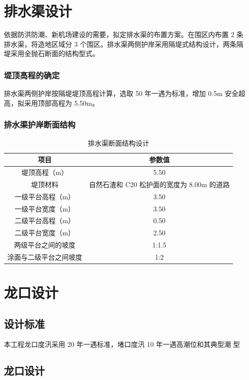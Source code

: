 \documentclass[UTF8, a4paper, 12pt]{ctexart} %
\begin{document}
\section{排水渠设计}
依据防洪防潮、新机场建设的需要，拟定排水渠的布置方案。在围区内布置 2 条排水渠，将造地区域分 3 个围区。排水渠两侧护岸采用隔堤式结构设计，两条隔堤采用全抛石断面的结构型式。

\subsubsection{堤顶高程的确定}
排水渠两侧护岸按隔堤堤顶高程计算，选取 50 年一遇为标准，增加 0.5m 安全超高，拟采用顶部高程为 5.50m。

\subsubsection{排水渠护岸断面结构}
\begin{table}[h]
    \centering
    \caption{排水渠断面结构设计}
    \begin{tabular}{|c|c|}
        \hline
        \textbf{项目} & \textbf{参数值} \\ \hline
        堤顶高程（m） & 5.50 \\ \hline
        堤顶材料 & 自然石渣和 C20 松护面的宽度为 8.00m 的道路 \\ \hline
        一级平台高程（m） & 3.50 \\ \hline
        一级平台宽度（m） & 3.50 \\ \hline
        二级平台高程（m） & 0.50 \\ \hline
        二级平台宽度（m） & 2.50 \\ \hline
        两级平台之间的坡度 & 1:1.5 \\ \hline
        涂面与二级平台之间坡度 & 1:2 \\ \hline
    \end{tabular}
    \label{tab:drainage_channel_structure}
\end{table}

\section{龙口设计}
\subsection{设计标准}
本工程龙口度汛采用 20 年一遇标准，堵口度汛 10 年一遇高潮位和其典型潮
型
\subsection{龙口设计}
\end{document}

